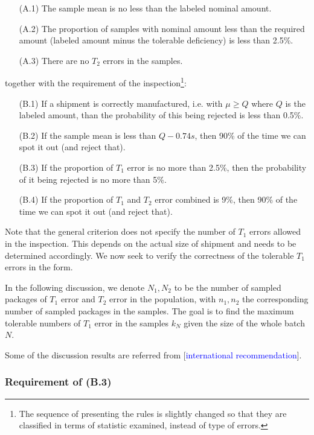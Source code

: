 \documentclass{article}
\def\unf#1{\textcolor{blue}{#1}}
\begin{document}
\begin{enumerate}
    \item[(A.1)] The sample mean is no less than the labeled nominal amount.
    \item[(A.2)] The proportion of samples with nominal amount less than the required amount (labeled amount minus the tolerable deficiency) is less than 2.5\%.
    \item[(A.3)] There are no $T_2$ errors in the samples. 
\end{enumerate}

together with the requirement of the inspection\footnote{The sequence of presenting the rules is slightly changed so that they are classified in terms of statistic examined, instead of type of errors.}:
\begin{enumerate}
    \item[(B.1)] If a shipment is correctly manufactured, i.e. with $\mu\geq Q$ where $Q$ is the labeled amount, than the probability of this being rejected is less than 0.5\%.
    \item[(B.2)] If the sample mean is less than $Q-0.74s$, then 90\% of the time we can spot it out (and reject that).
    \item[(B.3)] If the proportion of $T_1$ error is no more than 2.5\%, then the probability of it being rejected is no more than 5\%.
    \item[(B.4)] If the proportion of $T_1$ and $T_2$ error combined is 9\%, then 90\% of the time we can spot it out (and reject that).
\end{enumerate}

Note that the general criterion does not specify the number of $T_1$ errors allowed in the inspection. This depends on the actual size of shipment and needs to be determined accordingly. We now seek to verify the correctness of the tolerable $T_1$ errors in the form. 

In the following discussion, we denote $N_1, N_2$ to be the number of sampled packages of $T_1$ error and $T_2$ error in the population, with $n_1, n_2$ the corresponding number of sampled packages in the samples. The goal is to find the maximum tolerable numbers of $T_1$ error in the samples $k_{N}$ given the size of the whole batch $N$. 

Some of the discussion results are referred from [\unf{international recommendation}].

\subsubsection{Requirement of (B.3)}
\end{document}
